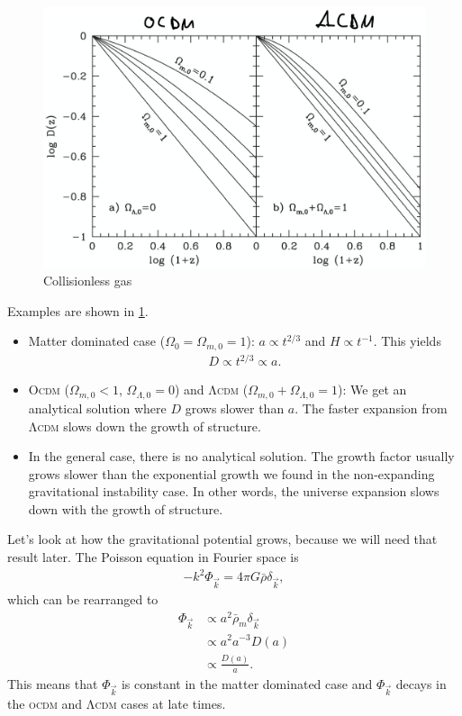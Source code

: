 \begin{figure}
	\centering
	\includegraphics[width=\textwidth]{img/ch-03/collisionless-gas.png}
	\caption{Collisionless gas}
	\label{fig:collisionless-gas}
\end{figure}

Examples are shown in \cref{fig:collisionless-gas}.
\begin{itemize}
	\item Matter dominated case ($\Omega_0 = \Omega_{m,0} = 1$): $a \propto t^{2/3}$ and $H \propto t^{-1}$. This yields
	\begin{align*}
		D \propto t^{2/3} \propto a.
	\end{align*}
	\item \textsc{Ocdm} ($\Omega_{m,0} < 1$, $\Omega_{\Lambda,0} = 0$) and \textsc{Λcdm} ($\Omega_{m,0} + \Omega_{\Lambda,0} = 1$): We get an analytical solution where $D$ grows slower than $a$. The faster expansion from \textsc{Λcdm} slows down the growth of structure.
	\item In the general case, there is no analytical solution. The growth factor usually grows slower than the exponential growth we found in the non-expanding gravitational instability case. In other words, the universe expansion slows down with the growth of structure.
\end{itemize}



Let's look at how the gravitational potential grows, because we will need that result later. The Poisson equation in Fourier space is
\begin{align*}
	- k^2 \Phi_{\vec{k}} = 4 \pi G \bar{\rho} \delta_{\vec{k}},
\end{align*}
which can be rearranged to
\begin{align*}
	\Phi_{\vec{k}}
	&\propto a^2 \bar{\rho}_m \delta_{\vec{k}}\\
	&\propto a^2 a^{-3} D(a) \\
	&\propto \frac{D(a)}{a}.
\end{align*}
This means that $\Phi_{\vec{k}}$ is constant in the matter dominated case and $\Phi_{\vec{k}}$ decays in the \textsc{ocdm} and \textsc{Λcdm} cases at late times.


